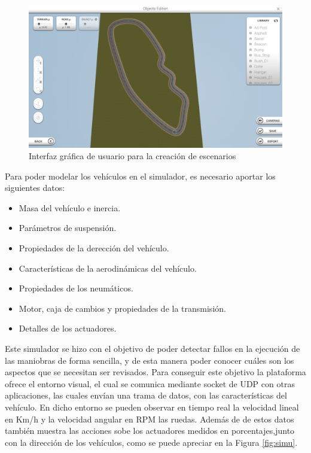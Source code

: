 \begin{figure}[!h]
	\centering
		\includegraphics[scale=0.3]{Imagenes/ste}
		\caption{Interfaz gráfica de usuario para la creación de escenarios}
		\label{fig:ste}
\end{figure}	


\par Para poder modelar los vehículos en el simulador, es necesario aportar los siguientes datos:

\begin{itemize}
	\item Masa del vehículo e inercia.
	\item Parámetros de suspensión.
	\item Propiedades de la derección del vehículo.
	\item Características de la aerodinámicas del vehículo.
	\item Propiedades de los neumáticos.
	\item Motor, caja de cambios y propiedades de la transmisión.
	\item Detalles de los actuadores.
\end{itemize}
\par Este simulador se hizo con el objetivo de poder detectar fallos en la ejecución de las maniobras de forma sencilla, y de esta manera poder conocer cuáles son los aspectos que se necesitan ser revisados. Para conseguir este objetivo la plataforma ofrece el entorno visual, el cual se comunica mediante socket de UDP con otras aplicaciones, las cuales envían una trama de datos, con las características del vehículo. En dicho entorno se pueden observar en tiempo real la velocidad lineal en Km/h y la velocidad angular en RPM las ruedas. Además de de estos datos también muestra las acciones sobe los actuadores medidos en porcentajes,junto con la dirección de los vehículos, como se puede apreciar en la Figura \ref{fig:simu}.\\\\\\\\   

